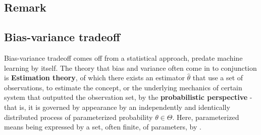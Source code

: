 \documentclass[10pt]{article}
\begin{document}
\subsection{Remark}

\subsection{Bias-variance tradeoff}

Bias-variance tradeoff comes off from a statistical approach, predate machine learning by itself. The theory that bias and variance often come in to conjunction is \textbf{Estimation theory}, of which there exists an estimator $\hat{\theta}$ that use a set of observations, to estimate the concept, or the underlying mechanics of certain system that outputted the observation set, by the \textbf{probabilistic perspective} - that is, it is governed by appearance by an independently and identically distributed process of parameterized probability $\theta\in \Theta$. Here, parameterized means being expressed by a set, often finite, of parameters, by \cite{LehmannCasella_theory_1998,liam_statistics_2005}. 
\end{document}
